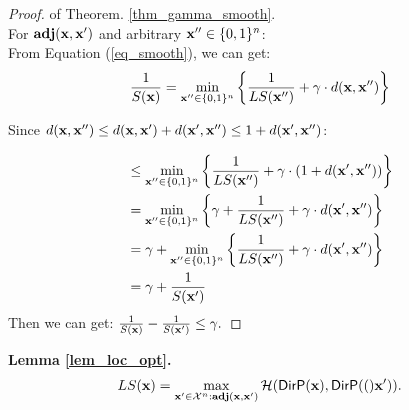 \documentclass{article}
\begin{document}
\begin{proof}
of Theorem. \ref{thm_gamma_smooth}.\\
For $\textbf{adj}(\textbf{x},\textbf{x}')$ and arbitrary $\textbf{x}'' \in \{0,1\}^{n}$:\\
From Equation (\ref{eq_smooth}), we can get:
\[
\frac{1}{S(\textbf{x})} 
 = \min_{\textbf{x}'' \in \{0,1\}^{n}}\bigg \{ \frac{1}{LS(\textbf{x}'')} +\gamma \cdot d(\textbf{x},\textbf{x}'') \bigg \}\\
\]

Since $d(\textbf{x},\textbf{x}'') \leq d(\textbf{x},\textbf{x}') + d(\textbf{x}',\textbf{x}'') \leq 1 + d(\textbf{x}',\textbf{x}'')$:

\begin{equation*}
\begin{split}
& \leq \min_{\textbf{x}'' \in \{0,1\}^{n}}\bigg \{  \frac{1}{LS(\textbf{x}'')} +\gamma \cdot (1 + d(\textbf{x}',\textbf{x}'')) \bigg \}\\
& = \min_{\textbf{x}'' \in \{0,1\}^{n}}\bigg \{
\gamma + \frac{1}{LS(\textbf{x}'')} +\gamma \cdot d(\textbf{x}',\textbf{x}'')\bigg 
\}\\
& = \gamma + \min_{\textbf{x}'' \in \{0,1\}^{n}}\bigg \{
\frac{1}{LS(\textbf{x}'')} +\gamma \cdot d(\textbf{x}',\textbf{x}'')\bigg
\}\\
& = \gamma + \frac{1}{S(\textbf{x}')}
\end{split}
\end{equation*}
Then we can get:
$\frac{1}{S(\textbf{x})} - \frac{1}{S(\textbf{x}')} \leq \gamma.$
\end{proof}


\noindent \textbf{Lemma \ref{lem_loc_opt}.}
\emph{
\[
LS(\textbf{x}) = \max\limits_{\textbf{x}' \in \mathcal{X}^n:\textbf{adj}(\textbf{x},\textbf{x}')} \mathcal{H}(\mathsf{DirP}(\textbf{x}), \mathsf{DirP}(()\textbf{x}')).
\]
}
\end{document}
